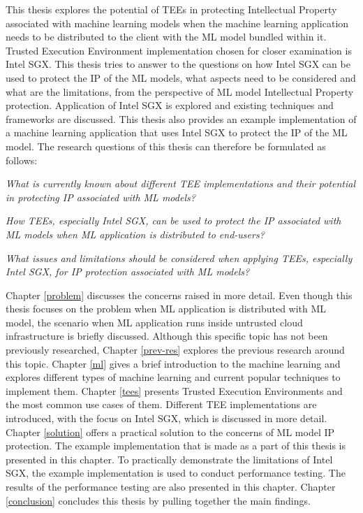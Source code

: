 This thesis explores the potential of TEEs in protecting Intellectual Property associated with machine learning models when the machine learning application needs to be distributed to the client with the ML model bundled within it. Trusted Execution Environment implementation chosen for closer examination is Intel SGX. This thesis tries to answer to the questions on how Intel SGX can be used to protect the IP of the ML models, what aspects need to be considered and what are the limitations, from the perspective of ML model Intellectual Property protection. Application of Intel SGX is explored and existing techniques and frameworks are discussed. This thesis also provides an example implementation of a machine learning application that uses Intel SGX to protect the IP of the ML model. The research questions of this thesis can therefore be formulated as follows:

\begin{questions}[itemindent=2em]
        \item\emph{What is currently known about different TEE implementations and their potential in protecting IP associated with ML models?\label{rq1}}
        \item\emph{How TEEs, especially Intel SGX, can be used to protect the IP associated with ML models when ML application is distributed to end-users?\label{rq2}}
        \item\emph{What issues and limitations should be considered when applying TEEs, especially Intel SGX, for IP protection associated with ML models?\label{rq3}}
\end{questions}

Chapter \ref{problem} discusses the concerns raised in more detail. Even though this thesis focuses on the problem when ML application is distributed with ML model, the scenario when ML application runs inside untrusted cloud infrastructure is briefly discussed. Although this specific topic has not been previously researched, Chapter \ref{prev-res} explores the previous research around this topic. Chapter \ref{ml} gives a brief introduction to the machine learning and explores different types of machine learning and current popular techniques to implement them. Chapter \ref{tees} presents Trusted Execution Environments and the most common use cases of them. Different TEE implementations are introduced, with the focus on Intel SGX, which is discussed in more detail. Chapter \ref{solution} offers a practical solution to the concerns of ML model IP protection. The example implementation that is made as a part of this thesis is presented in this chapter. To practically demonstrate the limitations of Intel SGX, the example implementation is used to conduct performance testing. The results of the performance testing are also presented in this chapter. Chapter \ref{conclusion} concludes this thesis by pulling together the main findings.
